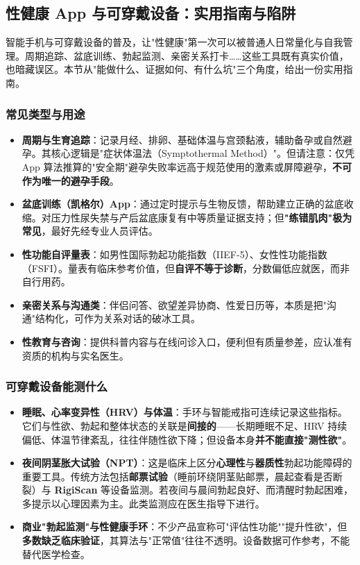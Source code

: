 \subsection{性健康 App 与可穿戴设备：实用指南与陷阱}

智能手机与可穿戴设备的普及，让"性健康"第一次可以被普通人日常量化与自我管理。周期追踪、盆底训练、勃起监测、亲密关系打卡……这些工具既有真实价值，也暗藏误区。本节从"能做什么、证据如何、有什么坑"三个角度，给出一份实用指南。

\subsubsection{常见类型与用途}

\begin{itemize}
	\item \textbf{周期与生育追踪}：记录月经、排卵、基础体温与宫颈黏液，辅助备孕或自然避孕。其核心逻辑是"症状体温法（Symptothermal Method）"。但请注意：仅凭 App 算法推算的"安全期"避孕失败率远高于规范使用的激素或屏障避孕，\textbf{不可作为唯一的避孕手段}。
	\item \textbf{盆底训练（凯格尔）App}：通过定时提示与生物反馈，帮助建立正确的盆底收缩。对压力性尿失禁与产后盆底康复有中等质量证据支持；但\textbf{"练错肌肉"极为常见}，最好先经专业人员评估。
	\item \textbf{性功能自评量表}：如男性国际勃起功能指数（IIEF-5）、女性性功能指数（FSFI）。量表有临床参考价值，但\textbf{自评不等于诊断}，分数偏低应就医，而非自行用药。
	\item \textbf{亲密关系与沟通类}：伴侣问答、欲望差异协商、性爱日历等，本质是把"沟通"结构化，可作为关系对话的破冰工具。
	\item \textbf{性教育与咨询}：提供科普内容与在线问诊入口，便利但有质量参差，应认准有资质的机构与实名医生。
\end{itemize}

\subsubsection{可穿戴设备能测什么}

\begin{itemize}
	\item \textbf{睡眠、心率变异性（HRV）与体温}：手环与智能戒指可连续记录这些指标。它们与性欲、勃起和整体状态的关联是\textbf{间接的}——长期睡眠不足、HRV 持续偏低、体温节律紊乱，往往伴随性欲下降；但设备本身\textbf{并不能直接"测性欲"}。
	\item \textbf{夜间阴茎胀大试验（NPT）}：这是临床上区分\textbf{心理性}与\textbf{器质性}勃起功能障碍的重要工具。传统方法包括\textbf{邮票试验}（睡前环绕阴茎贴邮票，晨起查看是否断裂）与 \textbf{RigiScan} 等设备监测。若夜间与晨间勃起良好、而清醒时勃起困难，多提示以心理因素为主。此类监测应在医生指导下进行。
	\item \textbf{商业"勃起监测"与性健康手环}：不少产品宣称可"评估性功能""提升性欲"，但\textbf{多数缺乏临床验证}，其算法与"正常值"往往不透明。设备数据可作参考，不能替代医学检查。
\end{itemize}

